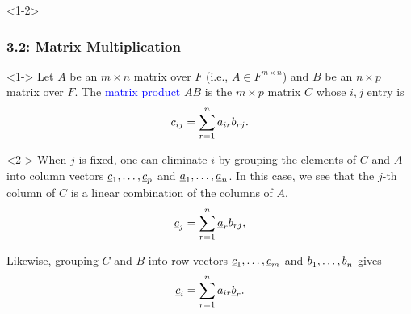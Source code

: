 \documentclass[10pt,english,aspectratio=169]{beamer}
\begin{document}
\begin{frame}<1-2> \frametitle{3.2: Matrix Multiplication}

\vspace{-1mm}

\begin{definition}<1->
Let $A$ be an $m \times n$ matrix over $F$ (i.e., $A \in F^{m\times n}$) and $B$ be an $n \times p$ matrix over $F$.
The \textcolor{blue}{matrix product} $AB$ is the $m \times p$ matrix $C$ whose $i,j$ entry is \vspace{-3mm}
\begin{equation*}
c_{ij} = \sum_{r = 1}^n a_{ir} b_{rj}. \vspace{-0.25mm}
\end{equation*}
\end{definition}


\begin{example}<2->
When $j$ is fixed, one can eliminate $i$ by grouping the elements of $C$ and $A$ into column vectors $\underline{c}_1,\ldots,\underline{c}_{p}$ and $\underline{a}_1,\ldots,\underline{a}_n$. In this case, we see that the $j$-th column of $C$ is a linear combination of the columns of $A$, \vspace{-3mm}
\[ \vecnot{c}_{j} = \sum_{r = 1}^n \vecnot{a}_r b_{rj}, \vspace*{-2.5mm} \]

Likewise, grouping $C$ and $B$ into row vectors  $\underline{c}_1,\ldots,\underline{c}_{m}$ and $\underline{b}_1,\ldots,\underline{b}_n$ gives \vspace{-3mm}
\[ \vecnot{c}_{i} = \sum_{r = 1}^n a_{ir} \vecnot{b}_r. \vspace{-0.25mm} \]
\end{example}



\end{frame}
\end{document}
